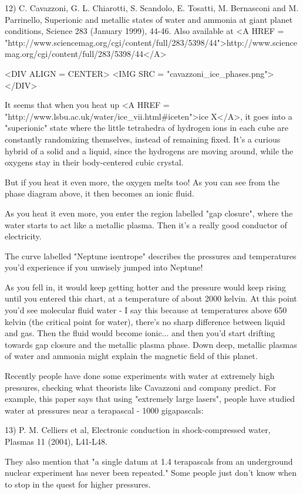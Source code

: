 12) C. Cavazzoni, G. L. Chiarotti, S. Scandolo, E. Tosatti, M. Bernasconi
and M. Parrinello, Superionic and metallic states of water and ammonia 
at giant planet conditions, Science 283 (January 1999), 44-46.  
Also available at <A HREF = "http://www.sciencemag.org/cgi/content/full/283/5398/44">http://www.sciencemag.org/cgi/content/full/283/5398/44</A>

<DIV ALIGN = CENTER>
<IMG SRC = "cavazzoni_ice_phases.png">
</DIV>

It seems that when you heat up 
<A HREF = "http://www.lsbu.ac.uk/water/ice_vii.html#iceten">ice X</A>,
it goes into a "superionic"
state where the little tetrahedra of hydrogen ions in each cube are
constantly randomizing themselves, instead of remaining fixed. 
It's a curious hybrid of a solid and a liquid, since the hydrogens 
are moving around, while the oxygens stay in their body-centered
cubic crystal.  

But if you heat it even more, the oxygen melts too!  As you can see 
from the phase diagram above, it then becomes an ionic fluid. 

As you heat it even more, you enter the region labelled "gap
closure", where the water starts to act like a metallic plasma.
Then it's a really good conductor of electricity.

The curve labelled "Neptune isentrope" describes the pressures 
and
temperatures you'd experience if you unwisely jumped into Neptune!

As you fell in, it would keep getting hotter and the pressure would 
keep rising until you entered this chart, at a temperature of about
2000 kelvin.  At this point you'd see molecular fluid water - I say 
this because at temperatures above 650 kelvin (the critical point 
for water), there's no sharp difference between liquid and gas.  
Then the fluid would become ionic... and then you'd start drifting
towards gap closure and the metallic plasma phase.  Down deep,
metallic plasmas of water and ammonia might explain the magnetic
field of this planet.

Recently people have done some experiments with water at extremely
high pressures, checking what theorists like Cavazzoni and company
predict.  For example, this paper says that using "extremely large
lasers", people have studied water at pressures near a terapascal -
1000 gigapascals:

13) P. M. Celliers et al, Electronic conduction in shock-compressed
water, Plasmas 11 (2004), L41-L48.

They also mention that "a single datum at 1.4 terapascals from an
underground nuclear experiment has never been repeated."  Some people
just don't know when to stop in the quest for higher pressures.

